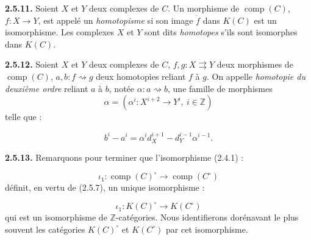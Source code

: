 %
\noindent\textbf{2.5.11.}\quad
{}
Soient $X$ et $Y$ deux complexes de $C$. Un morphisme de
$\operatorname{comp}(C)$, $f\colon X\longrightarrow Y$, est appelé un
\emph{homotopisme} si son image $\dot f$ dans $K(C)$ est un isomorphisme.
Les complexes $X$ et $Y$ sont dits \emph{homotopes} s'ils sont isomorphes
dans $K(C)$.

\noindent\textbf{2.5.12.}\quad
{}
Soient $X$ et $Y$ deux complexes de $C$,
$f,g\colon X\rightrightarrows Y$ deux morphismes de
$\operatorname{comp}(C)$,
$a,b\colon f\rightsquigarrow g$ deux homotopies reliant $f$ à $g$.
On appelle \emph{homotopie du deuxième ordre} reliant $a$ à $b$, notée
$\alpha\colon a\rightsquigarrow b$, une famille de morphismes
\[
  \alpha=(\alpha^i\colon X^{i+2}\longrightarrow Y^i,\ i\in\mathbb Z)
\]
telle que :

\begin{equation}
  b^i-a^i
  =\alpha^i d_X^{i+1}-d_Y^{i-1}\alpha^{i-1}.
  \tag{2.5.12.1}
\end{equation}

\noindent\textbf{2.5.13.}\quad
Remarquons pour terminer que l'isomorphisme (2.4.1) :

\begin{equation*}
  \iota_1\colon
  \operatorname{comp}(C)^\circ
  \longrightarrow
  \operatorname{comp}(C^\circ)
\end{equation*}
définit, en vertu de (2.5.7), un unique isomorphisme :

\begin{equation*}
  \iota_1\colon
  K(C)^\circ
  \longrightarrow
  K(C^\circ)
\end{equation*}
qui est un isomorphisme de $\mathbb Z$-catégories.
Nous identifierons dorénavant le plus souvent les catégories $K(C)^\circ$ et
$K(C^\circ)$ par cet isomorphisme.
